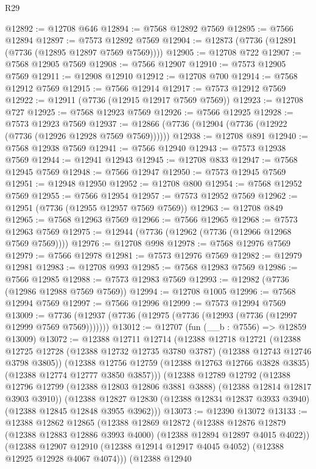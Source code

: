 \begin{lexlean}{R29}
\begin{coremodule}
@12892 := @12708 @646
@12894 := @7568 @12892 @7569
@12895 := @7566 @12894
@12897 := @7573 @12892 @7569
@12904 := @12873 (@7736 (@12891 (@7736 (@12895 @12897 @7569 @7569))))
@12905 := @12708 @722
@12907 := @7568 @12905 @7569
@12908 := @7566 @12907
@12910 := @7573 @12905 @7569
@12911 := @12908 @12910
@12912 := @12708 @700
@12914 := @7568 @12912 @7569
@12915 := @7566 @12914
@12917 := @7573 @12912 @7569
@12922 := @12911 (@7736 (@12915 @12917 @7569 @7569))
@12923 := @12708 @727
@12925 := @7568 @12923 @7569
@12926 := @7566 @12925
@12928 := @7573 @12923 @7569
@12937 := @12866 (@7736 (@12904 (@7736 (@12922 (@7736 (@12926 @12928 @7569 @7569))))))
@12938 := @12708 @891
@12940 := @7568 @12938 @7569
@12941 := @7566 @12940
@12943 := @7573 @12938 @7569
@12944 := @12941 @12943
@12945 := @12708 @833
@12947 := @7568 @12945 @7569
@12948 := @7566 @12947
@12950 := @7573 @12945 @7569
@12951 := @12948 @12950
@12952 := @12708 @800
@12954 := @7568 @12952 @7569
@12955 := @7566 @12954
@12957 := @7573 @12952 @7569
@12962 := @12951 (@7736 (@12955 @12957 @7569 @7569))
@12963 := @12708 @849
@12965 := @7568 @12963 @7569
@12966 := @7566 @12965
@12968 := @7573 @12963 @7569
@12975 := @12944 (@7736 (@12962 (@7736 (@12966 @12968 @7569 @7569))))
@12976 := @12708 @998
@12978 := @7568 @12976 @7569
@12979 := @7566 @12978
@12981 := @7573 @12976 @7569
@12982 := @12979 @12981
@12983 := @12708 @993
@12985 := @7568 @12983 @7569
@12986 := @7566 @12985
@12988 := @7573 @12983 @7569
@12993 := @12982 (@7736 (@12986 @12988 @7569 @7569))
@12994 := @12708 @1005
@12996 := @7568 @12994 @7569
@12997 := @7566 @12996
@12999 := @7573 @12994 @7569
@13009 := @7736 (@12937 (@7736 (@12975 (@7736 (@12993 (@7736 (@12997 @12999 @7569 @7569)))))))
@13012 := @12707 (fun (__b : @7556) => @12859 @13009)
@13072 := @12388
    @12711
    @12714
    (@12388
      @12718
      @12721
      (@12388 @12725 @12728 (@12388 @12732 @12735 @3780 @3787) (@12388 @12743 @12746 @3798 @3805))
      (@12388 @12756 @12759 (@12388 @12763 @12766 @3828 @3835) (@12388 @12774 @12777 @3850 @3857)))
    (@12388
      @12789
      @12792
      (@12388 @12796 @12799 (@12388 @12803 @12806 @3881 @3888) (@12388 @12814 @12817 @3903 @3910))
      (@12388 @12827 @12830 (@12388 @12834 @12837 @3933 @3940) (@12388 @12845 @12848 @3955 @3962)))
@13073 := @12390 @13072
@13133 := @12388
    @12862
    @12865
    (@12388
      @12869
      @12872
      (@12388 @12876 @12879 (@12388 @12883 @12886 @3993 @4000) (@12388 @12894 @12897 @4015 @4022))
      (@12388 @12907 @12910 (@12388 @12914 @12917 @4045 @4052) (@12388 @12925 @12928 @4067 @4074)))
    (@12388
      @12940

\end{coremodule}
\end{lexlean}
